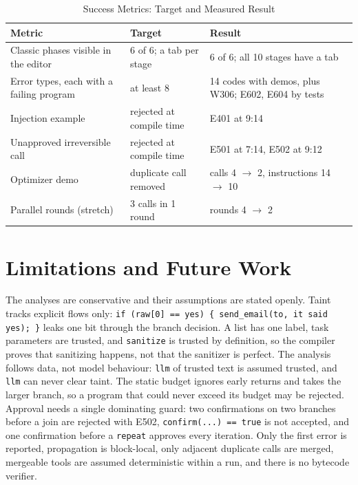 \documentclass[conference]{IEEEtran}
\begin{document}
\begin{table}[!htb]
\caption{Success Metrics: Target and Measured Result}
\label{tab:metrics}
\centering
\footnotesize
\setlength{\tabcolsep}{3pt}
\renewcommand{\arraystretch}{1.1}
\begin{tabular}{P{1.065in}P{1.015in}P{1.165in}}
\hline
\textbf{Metric} & \textbf{Target} & \textbf{Result} \\
\hline
Classic phases visible in the editor & 6 of 6; a tab per stage & 6 of 6; all 10 stages have a tab \\
Error types, each with a failing program & at least 8 & 14 codes with demos, plus W306; E602, E604 by tests \\
Injection example & rejected at compile time & E401 at 9:14 \\
Unapproved irreversible call & rejected at compile time & E501 at 7:14, E502 at 9:12 \\
Optimizer demo & duplicate call removed & calls 4 $\rightarrow$ 2, instructions 14 $\rightarrow$ 10 \\
Parallel rounds (stretch) & 3 calls in 1 round & rounds 4 $\rightarrow$ 2 \\
\hline
\end{tabular}
\end{table}
\section{Limitations and Future Work}
The analyses are conservative and their assumptions are stated openly. Taint tracks explicit flows only: \texttt{if (raw[0] == \textquotedbl{}yes\textquotedbl{}) \{ send\_email(to,\allowbreak{} \textquotedbl{}it said yes\textquotedbl{}); \}} leaks one bit through the branch decision. A list has one label, task parameters are trusted, and \texttt{sanitize} is trusted by definition, so the compiler proves that sanitizing happens, not that the sanitizer is perfect. The analysis follows data, not model behaviour: \texttt{llm} of trusted text is assumed trusted, and \texttt{llm} can never clear taint. The static budget ignores early returns and takes the larger branch, so a program that could never exceed its budget may be rejected. Approval needs a single dominating guard: two confirmations on two branches before a join are rejected with E502, \texttt{confirm(...) == true} is not accepted, and one confirmation before a \texttt{repeat} approves every iteration. Only the first error is reported, propagation is block-local, only adjacent duplicate calls are merged, mergeable tools are assumed deterministic within a run, and there is no bytecode verifier.
\end{document}
